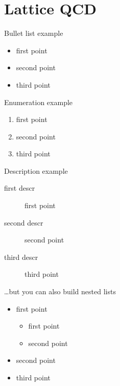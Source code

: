\chapter[LQCD]{Lattice QCD}
Bullet list example
\begin{itemize}
\item first point
\item second point
\item third point \\
\end{itemize}

\noindent
Enumeration example
\begin{enumerate}
\item first point
\item second point
\item third point\\
\end{enumerate}

\noindent
Description example
\begin{description}
\item[first descr] first point
\item[second descr]  second point
\item[third descr]  third point\\
\end{description}

\noindent
\dots but you can also build nested lists
\begin{itemize}
\item first point
	\begin{itemize} %
	\item first point
	\item second point
	\end{itemize}
\item second point
\item third point \\
\end{itemize}
